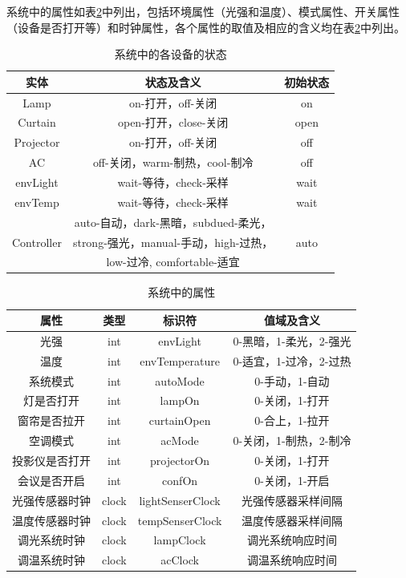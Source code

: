 \documentclass[journal, a4paper]{IEEEtran}
\begin{document}
系统中的属性如表\ref{table:property}中列出，包括环境属性（光强和温度）、模式属性、开关属性（设备是否打开等）和时钟属性，各个属性的取值及相应的含义均在表\ref{table:property}中列出。

\begin{table}[t]\scriptsize
    \centering
    \begin{tabular}{ccc}
    \toprule
        实体 & 状态及含义 & 初始状态 \\
    \midrule
        Lamp & on-打开，off-关闭 & on \\
        Curtain & open-打开，close-关闭 & open \\
        Projector & on-打开，off-关闭 & off \\
        AC & off-关闭，warm-制热，cool-制冷 & off \\
    \midrule
        envLight & wait-等待，check-采样 & wait \\
        envTemp & wait-等待，check-采样 & wait \\
    \midrule
        \multirow{3}{*}{Controller} & auto-自动，dark-黑暗，subdued-柔光， & \multirow{3}{*}{auto} \\
         & strong-强光，manual-手动，high-过热， & \\
         & low-过冷, comfortable-适宜 & \\
    \bottomrule
    \end{tabular}
    \caption{系统中的各设备的状态}
    \label{table:state}
\end{table}

\begin{table}[t]\scriptsize
    \centering
    \begin{tabular}{cccc}
    \toprule
        属性 & 类型 & 标识符 & 值域及含义 \\
    \midrule
        光强 & int & envLight & 0-黑暗，1-柔光，2-强光 \\
        温度 & int & envTemperature & 0-适宜，1-过冷，2-过热 \\
        系统模式 & int & autoMode & 0-手动，1-自动 \\
        灯是否打开 & int & lampOn & 0-关闭，1-打开 \\
        窗帘是否拉开 & int & curtainOpen & 0-合上，1-拉开 \\
        空调模式 & int & acMode & 0-关闭，1-制热，2-制冷 \\
        投影仪是否打开 & int & projectorOn & 0-关闭，1-打开 \\
        会议是否开启 & int & confOn & 0-关闭，1-开启 \\
        光强传感器时钟 & clock & lightSenserClock & 光强传感器采样间隔 \\
        温度传感器时钟 & clock & tempSenserClock & 温度传感器采样间隔 \\
        调光系统时钟 & clock & lampClock & 调光系统响应时间 \\
        调温系统时钟 & clock & acClock & 调温系统响应时间 \\
    \bottomrule
    \end{tabular}
    \caption{系统中的属性}
    \label{table:property}
\end{table}
\end{document}
